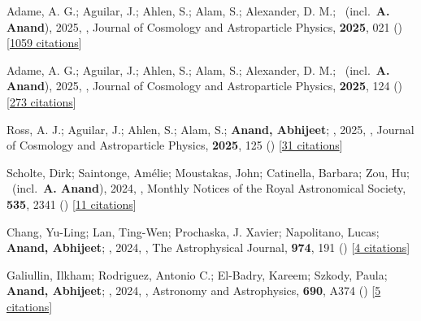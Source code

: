 \item[{\color{numcolor}\scriptsize14}] Adame, A. G.; Aguilar, J.; Ahlen, S.; Alam, S.; Alexander, D. M.; \etal\ (incl.\ \textbf{A. Anand}), 2025, , Journal of Cosmology and Astroparticle Physics, \textbf{2025}, 021 () [\href{https://ui.adsabs.harvard.edu/abs/2025JCAP...02..021A}{1059 citations}]

\item[{\color{numcolor}\scriptsize13}] Adame, A. G.; Aguilar, J.; Ahlen, S.; Alam, S.; Alexander, D. M.; \etal\ (incl.\ \textbf{A. Anand}), 2025, , Journal of Cosmology and Astroparticle Physics, \textbf{2025}, 124 () [\href{https://ui.adsabs.harvard.edu/abs/2025JCAP...01..124A}{273 citations}]

\item[{\color{numcolor}\scriptsize12}] Ross, A. J.; Aguilar, J.; Ahlen, S.; Alam, S.; \textbf{Anand, Abhijeet}; \etal, 2025, , Journal of Cosmology and Astroparticle Physics, \textbf{2025}, 125 () [\href{https://ui.adsabs.harvard.edu/abs/2025JCAP...01..125R}{31 citations}]

\item[{\color{numcolor}\scriptsize11}] Scholte, Dirk; Saintonge, Am{\'e}lie; Moustakas, John; Catinella, Barbara; Zou, Hu; \etal\ (incl.\ \textbf{A. Anand}), 2024, , Monthly Notices of the Royal Astronomical Society, \textbf{535}, 2341 () [\href{https://ui.adsabs.harvard.edu/abs/2024MNRAS.535.2341S}{11 citations}]

\item[{\color{numcolor}\scriptsize10}] Chang, Yu-Ling; Lan, Ting-Wen; Prochaska, J. Xavier; Napolitano, Lucas; \textbf{Anand, Abhijeet}; \etal, 2024, , The Astrophysical Journal, \textbf{974}, 191 () [\href{https://ui.adsabs.harvard.edu/abs/2024ApJ...974..191C}{4 citations}]

\item[{\color{numcolor}\scriptsize9}] Galiullin, Ilkham; Rodriguez, Antonio C.; El-Badry, Kareem; Szkody, Paula; \textbf{Anand, Abhijeet}; \etal, 2024, , Astronomy and Astrophysics, \textbf{690}, A374 () [\href{https://ui.adsabs.harvard.edu/abs/2024A&A...690A.374G}{5 citations}]

